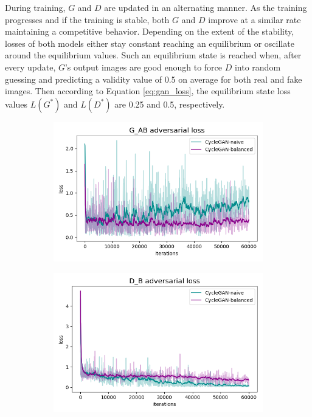 During training, $G$ and $D$ are updated in an alternating manner. As the training progresses and if the training is stable, both $G$ and $D$ improve at a similar rate maintaining a competitive behavior. Depending on the extent of the stability, losses of both models either stay constant reaching an equilibrium or oscillate around the equilibrium values. Such an equilibrium state is reached when, after every update, $G$'s output images are good enough to force $D$ into random guessing and predicting a validity value of 0.5 on average for both real and fake images. Then according to Equation \ref{eq:gan_loss}, the equilibrium state loss values $L(G^*)$ and $L(D^*)$ are 0.25 and 0.5, respectively. 

\begin{figure}[h!]
    \begin{subfigure}{.5\textwidth}
        \centering
        \includegraphics[width=.95\linewidth]{figures/Expt_2/gan_convergence/loss_G_AB.png}
        \caption{}
        \label{fig:loss_G_AB}
    \end{subfigure}
    \begin{subfigure}{.5\textwidth}
        \centering
        \includegraphics[width=.95\linewidth]{figures/Expt_2/gan_convergence/loss_D_B.png}
        \caption{}
        \label{fig:loss_D_B}
    \end{subfigure}
    \newline


\end{figure}
